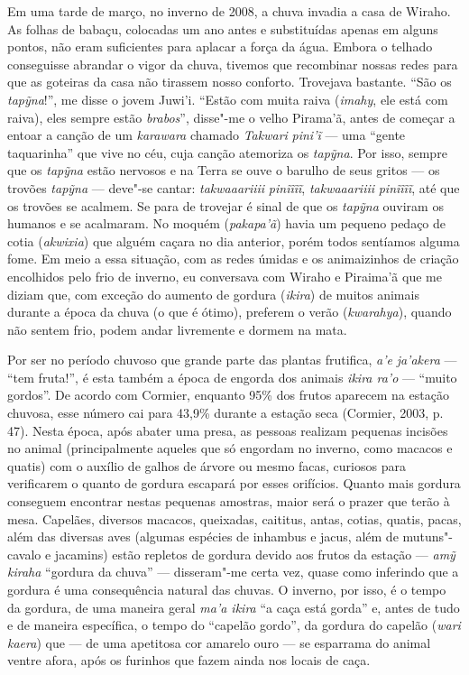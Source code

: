 Em uma tarde de março, no inverno de 2008, a chuva invadia a casa de
Wiraho. As folhas de babaçu, colocadas um ano antes e substituídas
apenas em alguns pontos, não eram suficientes para aplacar a força da
água. Embora o telhado conseguisse abrandar o vigor da chuva, tivemos
que recombinar nossas redes para que as goteiras da casa não tirassem
nosso conforto. Trovejava bastante. ``São os \emph{tapỹna}!'', me disse o
jovem Juwi'i. ``Estão com muita raiva (\emph{imahy}, ele está com
raiva), eles sempre estão \emph{brabos}'', disse"-me o velho Pirama'ã,
antes de começar a entoar a canção de um \emph{karawara} chamado
\emph{Takwari} \emph{pini'ĩ} --- uma ``gente taquarinha'' que vive no céu,
cuja canção atemoriza os \emph{tapỹna}. Por isso, sempre que os
\emph{tapỹna} estão nervosos e na Terra se ouve o barulho de seus gritos
--- os trovões \emph{tapỹna} --- deve"-se cantar: \emph{takwaaariiii}
\emph{pinĩĩĩĩ}, \emph{takwaaariiii} \emph{pinĩĩĩĩ}, até que os trovões
se acalmem. Se para de trovejar é sinal de que os \emph{tapỹna} ouviram
os humanos e se acalmaram. No moquém (\emph{pakapa'ã}) havia um pequeno
pedaço de cotia (\emph{akwixia}) que alguém caçara no dia anterior,
porém todos sentíamos alguma fome. Em meio a essa situação, com as redes
úmidas e os animaizinhos de criação encolhidos pelo frio de inverno, eu
conversava com Wiraho e Piraima'ã que me diziam que, com exceção do
aumento de gordura (\emph{ikira}) de muitos animais durante a época da
chuva (o que é ótimo), preferem o verão (\emph{kwarahya}), quando não
sentem frio, podem andar livremente e dormem na mata.

Por ser no período chuvoso que grande parte das plantas frutifica,
\emph{a'e} \emph{ja'akera} --- ``tem fruta!'', é esta também a época de
engorda dos animais \emph{ikira ra'o} --- ``muito gordos''. De acordo com
Cormier, enquanto 95\% dos frutos aparecem na estação chuvosa, esse
número cai para 43,9\% durante a estação seca (Cormier, 2003, p. 47).
Nesta época, após abater uma presa, as pessoas realizam pequenas
incisões no animal (principalmente aqueles que só engordam no inverno,
como macacos e quatis) com o auxílio de galhos de árvore ou mesmo facas,
curiosos para verificarem o quanto de gordura escapará por esses
orifícios. Quanto mais gordura conseguem encontrar nestas pequenas
amostras, maior será o prazer que terão à mesa. Capelães, diversos
macacos, queixadas, caititus, antas, cotias, quatis, pacas, além das
diversas aves (algumas espécies de inhambus e jacus, além de
mutuns"-cavalo e jacamins) estão repletos de gordura devido aos frutos da
estação --- \emph{amỹ kiraha} ``gordura da chuva'' --- disseram"-me certa vez,
quase como inferindo que a gordura é uma consequência natural das
chuvas. O inverno, por isso, é o tempo da gordura, de uma maneira geral
\emph{ma'a ikira} ``a caça está gorda'' e, antes de tudo e de maneira
específica, o tempo do ``capelão gordo'', da gordura do capelão
(\emph{wari kaera}) que --- de uma apetitosa cor amarelo ouro --- se
esparrama do animal ventre afora, após os furinhos que fazem ainda nos
locais de caça.

